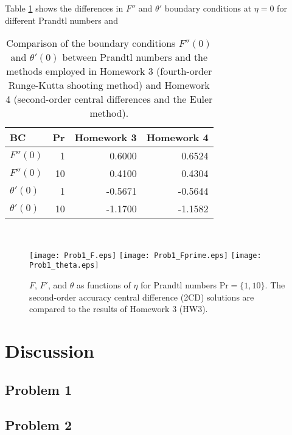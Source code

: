 \documentclass[11pt]{article}
\begin{document}
Table \ref{tbl:Prob1} shows the differences in $F''$ and $\theta'$ boundary conditions at $\eta = 0$ for different Prandtl numbers and 

\begin{table}[h!]
\centering
\begin{tabular}{lrrr}
\toprule
BC & Pr & Homework 3 & Homework 4 \\
\midrule
    $F''(0)$ &  1 &  0.6000 &  0.6524 \\
    $F''(0)$ & 10 &  0.4100 &  0.4304 \\
$\theta'(0)$ &  1 & -0.5671 & -0.5644 \\
$\theta'(0)$ & 10 & -1.1700 & -1.1582 \\
\bottomrule
\end{tabular}
\\[6pt]
\caption{Comparison of the boundary conditions $F''(0)$ and $\theta'(0)$ between Prandtl numbers and the methods employed in Homework 3 (fourth-order Runge-Kutta shooting method) and Homework 4 (second-order central differences and the Euler method).}
\label{tbl:Prob1}
\end{table}


\begin{figure}[h!]
\begin{center}
\texttt{[image: Prob1\_F.eps]}
\texttt{[image: Prob1\_Fprime.eps]}
\texttt{[image: Prob1\_theta.eps]}
\\[-0.5cm]
\caption{$F$, $F'$, and $\theta$ as functions of $\eta$ for Prandtl numbers $\text{Pr} = \{1, 10\}$. The second-order accuracy central difference (2CD) solutions are compared to the results of Homework 3 (HW3).}
\label{fig:Prob1}
\end{center}
\end{figure}

\section{Discussion} %

\subsection{Problem 1}

\subsection{Problem 2}
\end{document}
